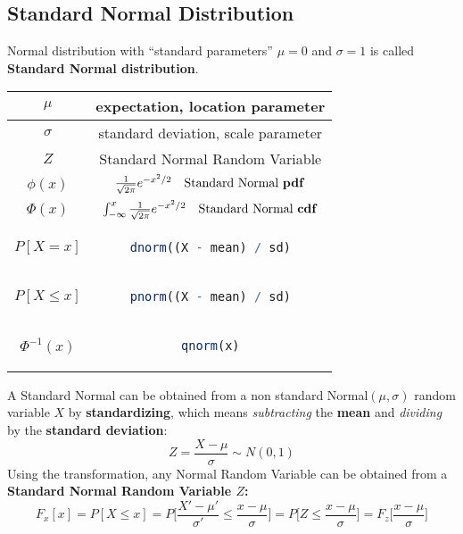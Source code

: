 \subsection{Standard Normal Distribution}
\begin{tcolorbox}
Normal distribution with “standard parameters” \(\mu = 0\) and \(\sigma = 1\) is called \textbf{Standard Normal distribution}.
\end{tcolorbox}
\begingroup
\setlength{\tabcolsep}{10pt} %
\renewcommand{\arraystretch}{1.5} %
\begin{center}
\begin{tabular}{ |c|c| } 
\hline
\(\mu\) & expectation, location parameter \\ \hline
\(\sigma\) & standard deviation, scale parameter \\ \hline
\(Z\) & Standard Normal Random Variable \\ \hline
\(\phi(x)\) & $\frac{1}{\sqrt{2\pi}}e^{-x^2/2} \quad\text{Standard Normal \textbf{pdf}}$ \\ \hline
\(\Phi(x)\) & $\int_{-\infty}^{x} \frac{1}{\sqrt{2\pi}}e^{-x^2/2} \quad\text{Standard Normal \textbf{cdf}}$ \\ \hline\hline
\(P[X = x]\) & \begin{lstlisting}[language=R]
dnorm((X - mean) / sd)
\end{lstlisting} \\ \hline
\(P[X \leq x]\) & \begin{lstlisting}[language=R]
pnorm((X - mean) / sd)
\end{lstlisting} \\ \hline
\(\Phi^{-1}(x)\) & \begin{lstlisting}[language=R]
qnorm(x)
\end{lstlisting} \\ \hline
\end{tabular}
\end{center}
\endgroup
A Standard Normal can be obtained from a non standard Normal\((\mu, \sigma)\) random variable \(X\) by \textbf{standardizing}, which means \textit{subtracting} the \textbf{mean} and \textit{dividing} by the \textbf{standard deviation}:
\[Z = \frac{X - \mu}{\sigma} \sim N(0,1)\]
Using the transformation, any Normal Random Variable can be obtained from a \textbf{Standard Normal Random Variable \(Z\):}
\[F_x[x] = P[X \leq x] = P\Big[\frac{X' - \mu'}{\sigma'} \leq \frac{x - \mu}{\sigma}\Big] = P\Big[Z \leq \frac{x - \mu}{\sigma}\Big] = F_z\Big[\frac{x - \mu}{\sigma}\Big]\]

